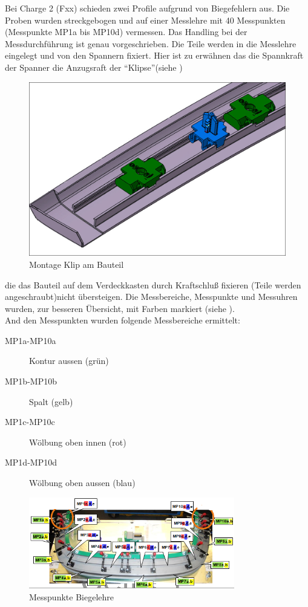 \documentclass[12pt,a4paper,parskip]{scrartcl}
\begin{document}
 Bei Charge 2 (Fxx) schieden zwei Profile aufgrund von Biegefehlern aus. Die Proben wurden streckgebogen und auf einer Messlehre  mit 40 Messpunkten (Messpunkte MP1a bis MP10d) vermessen. Das Handling bei der Messdurchführung ist genau vorgeschrieben. Die Teile werden in die Messlehre eingelegt und von den Spannern fixiert. Hier ist zu erwähnen das die Spannkraft der Spanner die Anzugsraft der "`Klipse"'(siehe )
 \begin{figure}[H]
 \centering
 \includegraphics[width=.8\textwidth]{klip}
 \caption{Montage Klip am Bauteil}
 \label{fig:klip}
 \end{figure}
 
 
  die das Bauteil auf dem Verdeckkasten durch Kraftschluß fixieren (Teile werden angeschraubt)nicht übersteigen. Die Messbereiche, Messpunkte und Messuhren wurden, zur besseren Übersicht, mit Farben markiert (siehe ).  \\
 And den Messpunkten wurden folgende Messbereiche ermittelt:
 \begin{description}
 \item[MP1a-MP10a] Kontur aussen (grün)
 \item[MP1b-MP10b] Spalt (gelb)
 \item[MP1c-MP10c] Wölbung oben innen (rot)
 \item[MP1d-MP10d] Wölbung oben aussen (blau)
 \end{description}
\begin{figure}[hbtp]
\centering
\includegraphics[width=0.8\textwidth]{messpunktevdkda3}
\caption{Messpunkte Biegelehre}
\label{fig:messpunktevdkda3}
\end{figure} 
 
\end{document}
